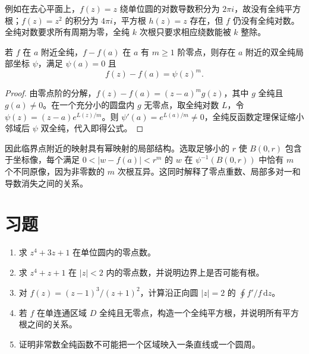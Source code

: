 例如在去心平面上，$f(z)=z$ 绕单位圆的对数导数积分为 $2\pi i$，故没有全纯平方根；$f(z)=z^2$ 的积分为 $4\pi i$，平方根 $h(z)=z$ 存在，但 $f$ 仍没有全纯对数。全纯对数要求所有周期为零，全纯 $k$ 次根只要求相应绕数能被 $k$ 整除。

\begin{proposition}[全纯映射的局部标准形]
\label{prop:ca-local-normal-form}
若 $f$ 在 $a$ 附近全纯，$f-f(a)$ 在 $a$ 有 $m\ge1$ 阶零点，则存在 $a$ 附近的双全纯局部坐标 $\psi$，满足 $\psi(a)=0$ 且
\[
 f(z)-f(a)=\psi(z)^m.
\]
\end{proposition}
\begin{proof}
由零点阶的分解，$f(z)-f(a)=(z-a)^m g(z)$，其中 $g$ 全纯且 $g(a)\ne0$。在一个充分小的圆盘内 $g$ 无零点，取全纯对数 $L$，令 $\psi(z)=(z-a)e^{L(z)/m}$。则 $\psi'(a)=e^{L(a)/m}\ne0$，全纯反函数定理保证缩小邻域后 $\psi$ 双全纯，代入即得公式。
\end{proof}

因此临界点附近的映射具有幂映射的局部结构。选取足够小的 $r$ 使 $B(0,r)$ 包含于坐标像，每个满足 $0<|w-f(a)|<r^m$ 的 $w$ 在 $\psi^{-1}(B(0,r))$ 中恰有 $m$ 个不同原像，因为非零数的 $m$ 次根互异。这同时解释了零点重数、局部多对一和导数消失之间的关系。

\section{习题}
\label{sec:ca-counting-ex}
\begin{enumerate}
 \item 求 $z^4+3z+1$ 在单位圆内的零点数。
 \item 求 $z^4+z+1$ 在 $|z|<2$ 内的零点数，并说明边界上是否可能有根。
 \item 对 $f(z)=(z-1)^3/(z+1)^2$，计算沿正向圆 $|z|=2$ 的 $\oint f'/f\,\mathrm dz$。
 \item 若 $f$ 在单连通区域 $D$ 全纯且无零点，构造一个全纯平方根，并说明所有平方根之间的关系。
 \item 证明非常数全纯函数不可能把一个区域映入一条直线或一个圆周。
\end{enumerate}

